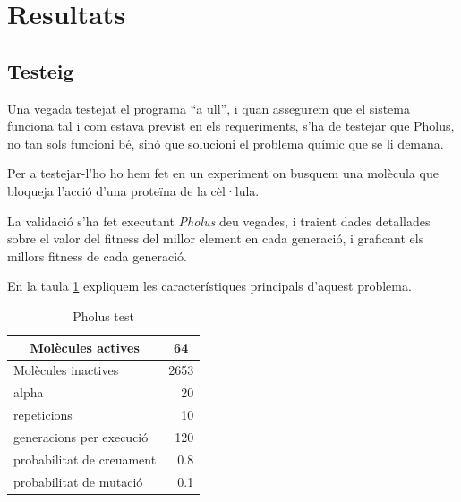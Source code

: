 
\section{Resultats} %
\label{sec:Resultats}

\subsection{Testeig} %
\label{sub:Testeig}

Una vegada testejat el programa ``a ull'', i quan assegurem que el sistema
funciona tal i com estava previst en els requeriments, s'ha de testejar que
Pholus, no tan sols funcioni bé, sinó que solucioni el problema químic que se li
demana.

Per a testejar-l'ho ho hem fet en un experiment on busquem una molècula que
bloqueja l'acció d'una proteïna de la cèl·lula.

La validació s'ha fet executant \emph{Pholus} deu vegades, i traient
dades detallades sobre el valor del fitness del millor element en cada
generació, i graficant els millors fitness de cada generació.

En la taula \ref{qrpholustest} expliquem les característiques principals d'aquest problema.


\begin{table}
\centering
\begin{tabular}{|l|r|}
\hline
\multicolumn{1}{|c|}{\textbf{Molècules actives }} & \multicolumn{1}{c|}{\textbf{ 64}} \\
\hline
\hline
Molècules inactives      & 2653 \\
alpha                     & 20   \\
repeticions               & 10   \\
generacions per execució & 120  \\
probabilitat de creuament & 0.8  \\
probabilitat de mutació  & 0.1  \\
\hline
\end{tabular}
\caption{Pholus test} \label{qrpholustest}
\end{table}


